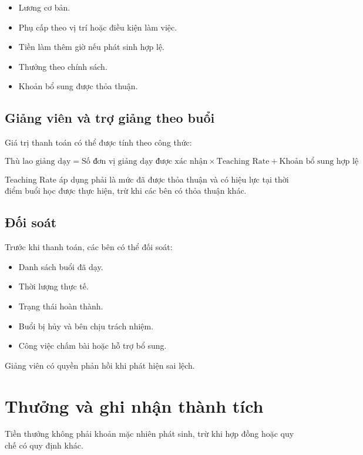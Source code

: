 \documentclass[12pt,a4paper]{article}
\begin{document}
\begin{itemize}
    \item Lương cơ bản.
    \item Phụ cấp theo vị trí hoặc điều kiện làm việc.
    \item Tiền làm thêm giờ nếu phát sinh hợp lệ.
    \item Thưởng theo chính sách.
    \item Khoản bổ sung được thỏa thuận.
\end{itemize}

\subsection{Giảng viên và trợ giảng theo buổi}

Giá trị thanh toán có thể được tính theo công thức:

\[
\text{Thù lao giảng dạy}
=
\text{Số đơn vị giảng dạy được xác nhận}
\times
\text{Teaching Rate}
+
\text{Khoản bổ sung hợp lệ}
\]

Teaching Rate áp dụng phải là mức đã được thỏa thuận và có hiệu lực
tại thời điểm buổi học được thực hiện, trừ khi các bên có thỏa thuận khác.

\subsection{Đối soát}

Trước khi thanh toán, các bên có thể đối soát:

\begin{itemize}
    \item Danh sách buổi đã dạy.
    \item Thời lượng thực tế.
    \item Trạng thái hoàn thành.
    \item Buổi bị hủy và bên chịu trách nhiệm.
    \item Công việc chấm bài hoặc hỗ trợ bổ sung.
\end{itemize}

Giảng viên có quyền phản hồi khi phát hiện sai lệch.

\section{Thưởng và ghi nhận thành tích}

Tiền thưởng không phải khoản mặc nhiên phát sinh,
trừ khi hợp đồng hoặc quy chế có quy định khác.
\end{document}
